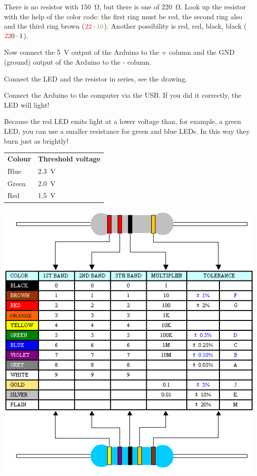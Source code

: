 \documentclass{arduino}
\begin{document}
\begin{alphalist}
\item There is no resistor with \SI{150}{\ohm}, but there is one of \SI{220}{\ohm}. Look up the resistor with the help of the color code: the first ring must be red, the second ring also and the third ring brown ($\textcolor{red}{2}\textcolor{red}{2} \cdot \textcolor{brown}{10}$). Another possibility is red, red, black, black ($\textcolor{red}{2}\textcolor{red}{2}\textcolor{black}{0} \cdot \textcolor{black}{1}$).

\item Now connect the \SI{5}{\volt} output of the Arduino to the + column and the GND (ground) output of the Arduino to the - column.

\item Connect the LED and the resistor in series, see the drawing.

\item Connect the Arduino to the computer via the USB. If you did it correctly, the LED will light!
\end{alphalist}

Because the red LED emits light at a lower voltage than, for example, a green LED, you can use a smaller resistance for green and blue LEDs. In this way they burn just as brightly!

\begin{tabular}{ll}
\textbf{Colour} & \textbf{Threshold voltage} \\
Blue            & \SI{2.3}{\volt}            \\
Green           & \SI{2.0}{\volt}            \\
Red             & \SI{1.5}{\volt}            \\
\end{tabular}

\begin{minipage}[t]{\linewidth}
\includegraphics[width=0.8\linewidth]{7. Component resistor values (EN)}
\end{minipage}
\end{document}
